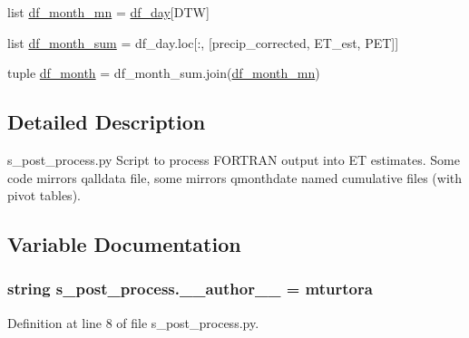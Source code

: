 \begin{DoxyCompactItemize}
\item 
list \hyperlink{namespaces__post__process_a3b843457bef429e8fb9f85dfc5cc9640}{df\+\_\+month\+\_\+mn} = \hyperlink{namespaces__post__process_a97279c14527d8c47412cec3c686f0d46}{df\+\_\+day}\mbox{[}\textquotesingle{}D\+T\+W\textquotesingle{}\mbox{]}
\item 
list \hyperlink{namespaces__post__process_a25a3476877b3efdf225f84a94fa05130}{df\+\_\+month\+\_\+sum} = df\+\_\+day.\+loc\mbox{[}\+:, \mbox{[}\textquotesingle{}precip\+\_\+corrected\textquotesingle{}, \textquotesingle{}E\+T\+\_\+est\textquotesingle{}, \textquotesingle{}P\+E\+T\textquotesingle{}\mbox{]}\mbox{]}
\item 
tuple \hyperlink{namespaces__post__process_ad04d032c16dc19da104e670a42d44369}{df\+\_\+month} = df\+\_\+month\+\_\+sum.\+join(\hyperlink{namespaces__post__process_a3b843457bef429e8fb9f85dfc5cc9640}{df\+\_\+month\+\_\+mn})
\end{DoxyCompactItemize}


\subsection{Detailed Description}
\begin{DoxyVerb}s_post_process.py
Script to process FORTRAN output into ET estimates.  Some code mirrors qalldata file,
   some mirrors qmonthdate named cumulative files (with pivot tables).
\end{DoxyVerb}
 

\subsection{Variable Documentation}
\hypertarget{namespaces__post__process_a48359acf9272ab2ce01abc37dcd5229d}{}
\subsubsection[{\+\_\+\+\_\+author\+\_\+\+\_\+}]{\setlength{\rightskip}{0pt plus 5cm}string s\+\_\+post\+\_\+process.\+\_\+\+\_\+author\+\_\+\+\_\+ = \textquotesingle{}mturtora\textquotesingle{}}\label{namespaces__post__process_a48359acf9272ab2ce01abc37dcd5229d}


Definition at line 8 of file s\+\_\+post\+\_\+process.\+py.

